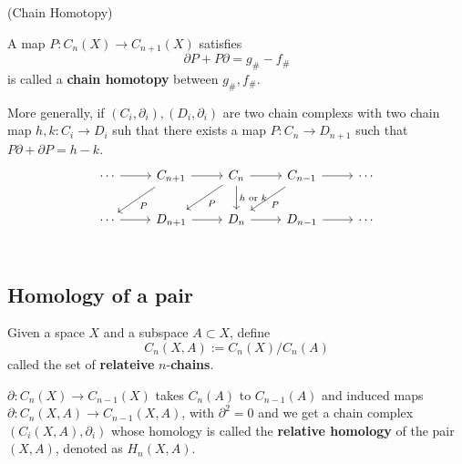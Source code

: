 \documentclass{article}
\begin{document}
\begin{definition}(Chain Homotopy)\par
    A map $P:C_n(X) \to C_{n+1}(X)$ satisfies
    \[\partial P + P\partial = g_{\#} - f_{\#}\]
    is called a \textbf{chain homotopy} between $g_{\#}, f_{\#}$.\par
    More generally, if $(C_i,\partial_i), (D_i,\partial_i)$ are two chain complexs with two chain map $h,k:C_i \to D_i$ suh that there exists a map $P:C_n\to D_{n+1}$ such that $P\partial + \partial P = h-k$.
    \[
    \begin{tikzcd}
        \cdots\arrow[r] & C_{n+1}\arrow[r]\arrow[ld,"P"] & C_n\arrow[r]\arrow[d,"h\text{ or }k"]\arrow[ld,"P"] & C_{n-1}\arrow[r]\arrow[ld,"P"] & \cdots \\
        \cdots\arrow[r] & D_{n+1}\arrow[r] & D_n\arrow[r] & D_{n-1}\arrow[r] & \cdots \\
    \end{tikzcd}
    \]
\end{definition}

\subsection{Homology of a pair}

\begin{definition}
    Given a space $X$ and a subspace $A\subset X$, define
    \[C_n(X,A):= C_n(X)/C_n(A)\]
    called the set of \textbf{relateive} $n$-\textbf{chains}.\par
    $\partial:C_n(X)\to C_{n-1}(X)$ takes $C_n(A)$ to $C_{n-1}(A)$ and induced maps $\partial:C_n(X,A)\to C_{n-1}(X,A)$, with $\partial^2 = 0$ and we get a chain complex $(C_i(X,A), \partial_i)$ whose homology is called the \textbf{relative homology} of the pair $(X,A)$, denoted as $H_n(X,A)$.
\end{definition}
\end{document}
